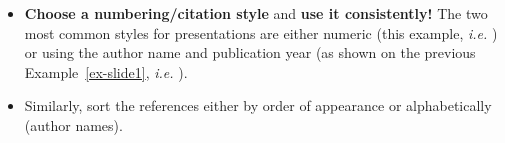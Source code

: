 \documentclass[11pt,a4paper]{article}
\begin{document}
\begin{goodexample}
  \begin{figure}[H]
    \centering%
    {%
      \setlength{\fboxsep}{0pt}%
      \setlength{\fboxrule}{2pt}%
    }
  \end{figure}
  
  \begin{itemize}[leftmargin=6pt]
    \item \textbf{Choose a numbering/citation style} and \textbf{use it consistently!} The two most common styles for presentations are either numeric (this example, \emph{i.e.} \goodstyle{[1]}) or using the author name and publication year (as shown on the previous Example~\ref{ex-slide1}, \emph{i.e.} \goodstyle{[Poier'18]}).
    \item Similarly, sort the references either by order of appearance or alphabetically (author names).
  \end{itemize}
\end{goodexample}
\end{document}

